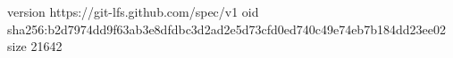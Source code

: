 version https://git-lfs.github.com/spec/v1
oid sha256:b2d7974dd9f63ab3e8dfdbc3d2ad2e5d73cfd0ed740c49e74eb7b184dd23ee02
size 21642
